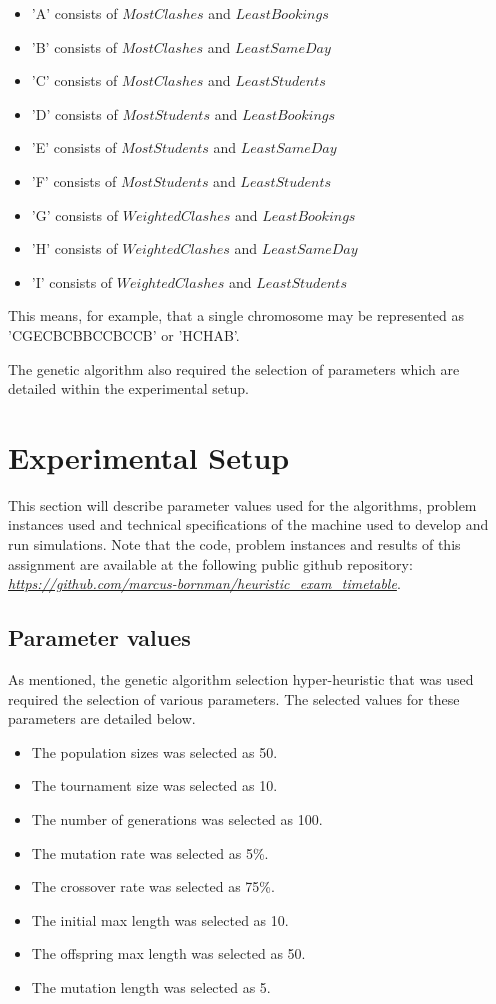 \documentclass[conference]{IEEEtran}
\begin{document}
\begin{itemize}
    \item 'A' consists of  \(MostClashes\) and  \(LeastBookings\)
    \item 'B' consists of  \(MostClashes\) and  \(LeastSameDay\)
    \item 'C' consists of  \(MostClashes\) and  \(LeastStudents\)
    \item 'D' consists of  \(MostStudents\) and  \(LeastBookings\)
    \item 'E' consists of  \(MostStudents\) and  \(LeastSameDay\)
    \item 'F' consists of  \(MostStudents\) and  \(LeastStudents\)
    \item 'G' consists of  \(WeightedClashes\) and  \(LeastBookings\)
    \item 'H' consists of  \(WeightedClashes\) and  \(LeastSameDay\)
    \item 'I' consists of  \(WeightedClashes\) and  \(LeastStudents\)
\end{itemize}

This means, for example, that a single chromosome may be represented as 'CGECBCBBCCBCCB' or 'HCHAB'.

The genetic algorithm also required the selection of parameters which are detailed within the experimental setup.


\section{Experimental Setup}

This section will describe parameter values used for the algorithms, problem instances used and technical specifications of the machine used to develop and run simulations. Note that the code, problem instances and results of this assignment are available at the following public github repository: \emph{\url{https://github.com/marcus-bornman/heuristic_exam_timetable}}.

\subsection{Parameter values}

As mentioned, the genetic algorithm selection hyper-heuristic that was used required the selection of various parameters. The selected values for these parameters are detailed below.

\begin{itemize}
    \item The population sizes was selected as 50.
    \item The tournament size was selected as 10.
    \item The number of generations was selected as 100.
    \item The mutation rate was selected as 5\%.
    \item The crossover rate was selected as 75\%.
    \item The initial max length was selected as 10.
    \item The offspring max length was selected as 50.
    \item The mutation length was selected as 5.
\end{itemize}
\end{document}
